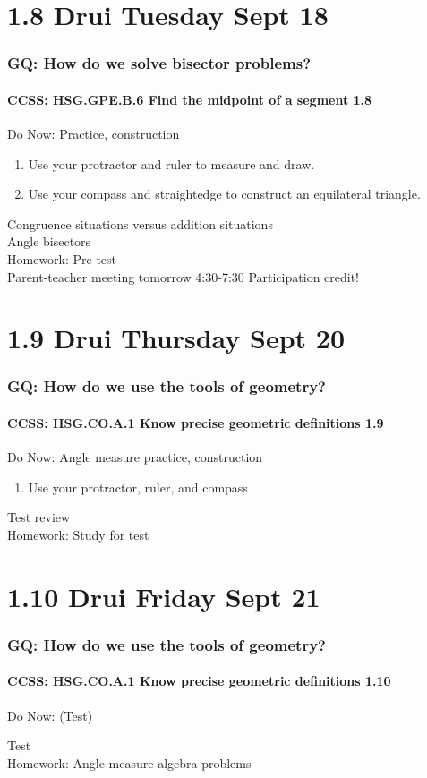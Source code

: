 \documentclass{beamer}
\begin{document}
\section{1.8 Drui Tuesday Sept 18}
  \frame
  {
    \frametitle{GQ: How do we solve bisector problems?}
    \framesubtitle{CCSS: HSG.GPE.B.6 Find the midpoint of a segment  \alert{1.8}}

    \begin{block}{Do Now: Practice, construction}
    \begin{enumerate}
        \item Use your protractor and ruler to measure and draw.
        \item Use your compass and straightedge to construct an equilateral triangle.
    \end{enumerate}
    \end{block}
    Congruence situations versus addition situations\\
    Angle bisectors\\
    \vspace{1cm}
    Homework: Pre-test\\
    Parent-teacher meeting tomorrow 4:30-7:30 \alert{Participation credit!}
  }

\section{1.9 Drui Thursday Sept 20}
  \frame
  {
    \frametitle{GQ: How do we use the tools of geometry?}
    \framesubtitle{CCSS: HSG.CO.A.1 Know precise geometric definitions  \alert{1.9}}

    \begin{block}{Do Now: Angle measure practice, construction}
    \begin{enumerate}
        \item Use your protractor, ruler, and compass
    \end{enumerate}
    \end{block}
    Test review\\
    \vspace{1cm}
    Homework: Study for test
  }

  \section{1.10 Drui Friday Sept 21}
    \frame
    {
      \frametitle{GQ: How do we use the tools of geometry?}
      \framesubtitle{CCSS: HSG.CO.A.1 Know precise geometric definitions  \alert{1.10}}

      \begin{block}{Do Now: (Test)}
      \end{block}
      Test\\
      \vspace{1cm}
      Homework: Angle measure algebra problems
    }
\end{document}
